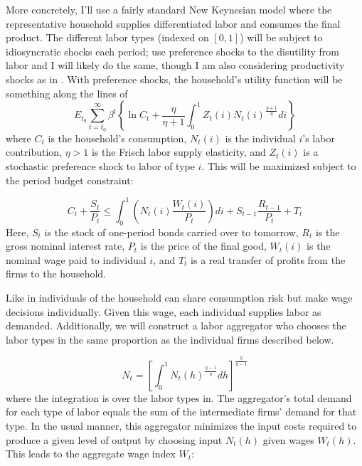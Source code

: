 \documentclass[12pt,a4paper]{article}            %
\begin{document}
More concretely, I'll use a fairly standard New Keynesian model where the representative household supplies differentiated labor and consumes the final product.
The different labor types (indexed on $[0, 1]$) will be subject to idiosyncratic shocks each period; \cite{daly_hobijn_2013} use preference shocks to the disutility from labor and I will likely do the same, though I am also considering productivity shocks as in \cite{fagan_messina_2009}. 
With preference shocks, the household's utility function will be something along the lines of
\begin{equation*}
    E_{t_0} \sum_{t=t_0}^{\infty} \beta^t \left\{\ln{C_t} + \frac{\eta}{\eta + 1} \int_{0}^{1} Z_t(i) N_t(i)^{\frac{\eta + 1}{\eta}} di \right\}
\end{equation*}
where $C_t$ is the household's consumption, $N_t(i)$ is the individual $i$'s labor contribution, $\eta > 1$ is the Frisch labor supply elasticity, and $Z_t(i)$ is a stochastic preference shock to labor of type $i$.
This will be maximized subject to the period budget constraint:

\begin{equation*}
    C_t + \frac{S_t}{P_t} \leq \int_{0}^{1} \left( N_t(i) \frac{W_t(i)}{P_t}\right) di + S_{t-1}\frac{R_{t-1}}{P_t} + T_t
\end{equation*}
Here, $S_t$ is the stock of one-period bonds carried over to tomorrow, $R_t$ is the gross nominal interest rate, $P_t$ is the price of the final good, $W_t(i)$ is the nominal wage paid to individual $i$, and $T_t$ is a real transfer of profits from the firms to the household.

Like in \cite{erceg_henderson_levin_1999} individuals of the household can share consumption risk but make wage decisions individually.
Given this wage, each individual supplies labor as demanded.  Additionally, we will construct a labor aggregator who chooses the labor types in the same proportion as the individual firms described below.

\begin{equation*}
    N_t = \left[ \int_{0}^{1} N_t(h)^{ \frac{\eta - 1}{\eta} } dh \right]^{ \frac{\eta}{\eta - 1} }
\end{equation*}
where the integration is over the labor types in. The aggregator's total demand for each type of labor equals the sum of the intermediate firms' demand for that type. In the usual manner, this aggregator minimizes the input costs required to produce a given level of output by choosing input $N_t(h)$ given wages $W_t(h)$.  This leads to the aggregate wage index $W_t$:
\end{document}
